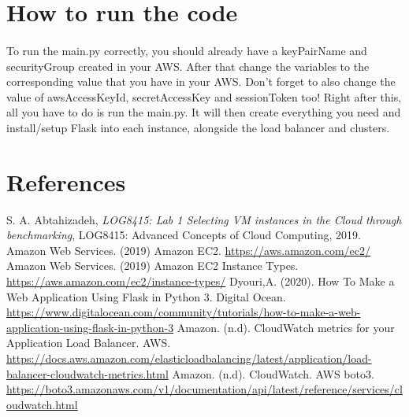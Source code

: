 \documentclass[12pt]{article}
\begin{document}
	\pagebreak


\section{How to run the code} \label{sec:runcode}
	\paragraph{} To run the main.py correctly, you should already have a keyPairName and securityGroup created in your AWS. After that 
	change the variables to the corresponding value that you have in your AWS. Don't forget to also change the value
	of awsAccessKeyId, secretAccessKey and sessionToken too! Right after this, all you have to do is run the main.py. It will then
	create everything you need and install/setup Flask into each instance, alongside the load balancer and clusters. 
	\bigskip


\section{References} \label{sec:references}
	
	\begin{thebibliography} {}
		 S. A. Abtahizadeh, \emph{LOG8415: Lab 1 Selecting VM instances in the Cloud through benchmarking}, LOG8415: Advanced Concepts of Cloud Computing, 2019.
		 Amazon Web Services. (2019) Amazon EC2. \url{https://aws.amazon.com/ec2/}
		 Amazon Web Services. (2019) Amazon EC2 Instance Types. \url{https://aws.amazon.com/ec2/instance-types/}
		 Dyouri,A. (2020). How To Make a Web Application Using Flask in Python 3. Digital Ocean.  \url{https://www.digitalocean.com/community/tutorials/how-to-make-a-web-application-using-flask-in-python-3}
		 Amazon. (n.d). CloudWatch metrics for your Application Load Balancer. AWS. \url{https://docs.aws.amazon.com/elasticloadbalancing/latest/application/load-balancer-cloudwatch-metrics.html}
		 Amazon. (n.d). CloudWatch. AWS boto3. \url{https://boto3.amazonaws.com/v1/documentation/api/latest/reference/services/cloudwatch.html}
	\end{thebibliography}
\end{document}
